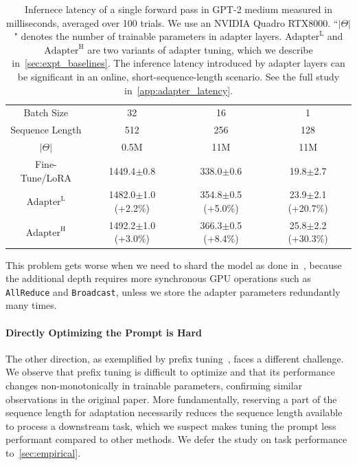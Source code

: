 \begin{table}[h]
  \centering
  \begin{tabular}{c|ccc}
  \hline
  \toprule
  
  Batch Size              &  32                 & 16        & 1    \\
  Sequence Length         &  512                & 256       & 128  \\
  $|\Theta|$              &  0.5M         & 11M & 11M     \\
  \midrule
  Fine-Tune/LoRA               & 1449.4$\pm$0.8           & 338.0$\pm$0.6  & 19.8$\pm$2.7 \\
  \midrule
  $\text{Adapter}^{\text{L}}$   & 1482.0$\pm$1.0 (\textcolor{myred1}{+2.2\%})  & 354.8$\pm$0.5 (\textcolor{myred2}{+5.0\%})  & 23.9$\pm$2.1 (\textcolor{myred3}{+20.7\%}) \\
  $\text{Adapter}^{\text{H}}$   & 1492.2$\pm$1.0 (\textcolor{myred1}{+3.0\%})  & 366.3$\pm$0.5 (\textcolor{myred2}{+8.4\%})  & 25.8$\pm$2.2 (\textcolor{myred3}{+30.3\%}) \\
  \bottomrule
  \end{tabular}
  \caption{Infernece latency of a single forward pass in GPT-2 medium measured in milliseconds, averaged over 100 trials. We use an NVIDIA Quadro RTX8000. ``$|\Theta|$" denotes the number of trainable parameters in adapter layers. $\text{Adapter}^{\text{L}}$ and $\text{Adapter}^{\text{H}}$ are two variants of adapter tuning, which we describe in~\autoref{sec:expt_baselines}. The inference latency introduced by adapter layers can be significant in an online, short-sequence-length scenario. See the full study in~\autoref{app:adapter_latency}.}
  \label{tab:adapter_slow}
\end{table}

This problem gets worse when we need to shard the model as done in~\citet{shoeybi2020megatronlm, lepikhin2020gshard}, because the additional depth requires more synchronous GPU operations such as \texttt{AllReduce} and \texttt{Broadcast}, unless we store the adapter parameters redundantly many times.

\paragraph{Directly Optimizing the Prompt is Hard}
The other direction, as exemplified by prefix tuning~\citep{li_prefix-tuning_2021}, faces a different challenge.
We observe that prefix tuning is difficult to optimize and that its performance changes non-monotonically in trainable parameters, confirming similar observations in the original paper.
More fundamentally, reserving a part of the sequence length for adaptation necessarily reduces the sequence length available to process a downstream task, which we suspect makes tuning the prompt less performant compared to other methods.
We defer the study on task performance to~\autoref{sec:empirical}.

